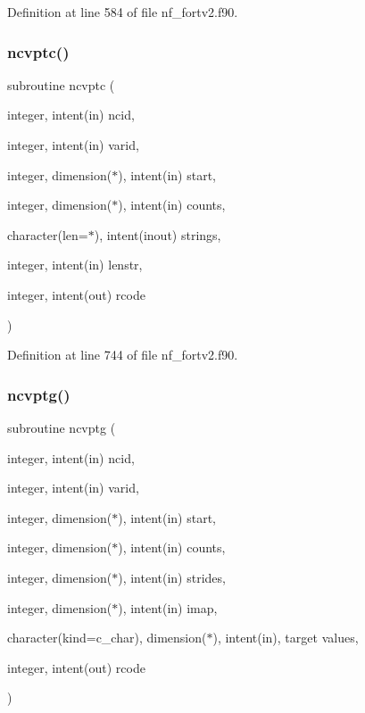 Definition at line 584 of file nf\+\_\+fortv2.\+f90.

\mbox{\label{nf__fortv2_8f90_a6c95aa587ee368266d7727735158957f}} 
\subsubsection{\texorpdfstring{ncvptc()}{ncvptc()}}
{\footnotesize\ttfamily subroutine ncvptc (\begin{DoxyParamCaption}\item[{integer, intent(in)}]{ncid,  }\item[{integer, intent(in)}]{varid,  }\item[{integer, dimension($\ast$), intent(in)}]{start,  }\item[{integer, dimension($\ast$), intent(in)}]{counts,  }\item[{character(len=$\ast$), intent(inout)}]{strings,  }\item[{integer, intent(in)}]{lenstr,  }\item[{integer, intent(out)}]{rcode }\end{DoxyParamCaption})}



Definition at line 744 of file nf\+\_\+fortv2.\+f90.

\mbox{\label{nf__fortv2_8f90_aacf3b20901c252480d87dc327cf6a9f5}} 
\subsubsection{\texorpdfstring{ncvptg()}{ncvptg()}}
{\footnotesize\ttfamily subroutine ncvptg (\begin{DoxyParamCaption}\item[{integer, intent(in)}]{ncid,  }\item[{integer, intent(in)}]{varid,  }\item[{integer, dimension($\ast$), intent(in)}]{start,  }\item[{integer, dimension($\ast$), intent(in)}]{counts,  }\item[{integer, dimension($\ast$), intent(in)}]{strides,  }\item[{integer, dimension($\ast$), intent(in)}]{imap,  }\item[{character(kind=c\+\_\+char), dimension($\ast$), intent(in), target}]{values,  }\item[{integer, intent(out)}]{rcode }\end{DoxyParamCaption})}



